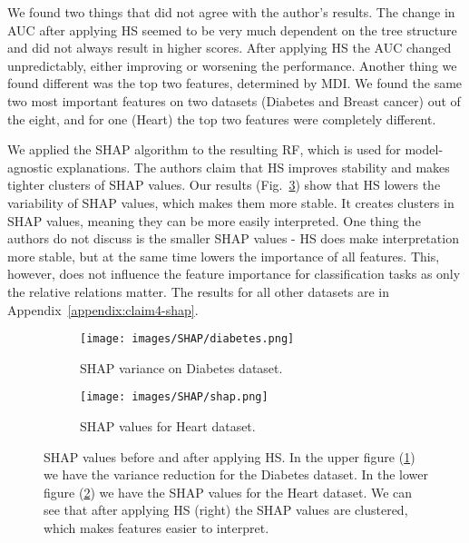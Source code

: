 We found two things that did not agree with the author's results. The change in AUC after applying HS seemed to be very much dependent on the tree structure and did not always result in higher scores. After applying HS the AUC changed unpredictably, either improving or worsening the performance. Another thing we found different was the top two features, determined by MDI. We found the same two most important features on two datasets (Diabetes and Breast cancer) out of the eight, and for one (Heart) the top two features were completely different.

We applied the SHAP algorithm \cite{lundberg2017unified} to the resulting RF, which is used for model-agnostic explanations. The authors claim that HS improves stability and makes tighter clusters of SHAP values. Our results (Fig.~\ref{fig:claim4-shap}) show that HS lowers the variability of SHAP values, which makes them more stable. It creates clusters in SHAP values, meaning they can be more easily interpreted. One thing the authors do not discuss is the smaller SHAP values - HS does make interpretation more stable, but at the same time lowers the importance of all features. This, however, does not influence the feature importance for classification tasks as only the relative relations matter. The results for all other datasets are in Appendix~\ref{appendix:claim4-shap}.

\begin{figure}[hbt]
    \centering
    \begin{subfigure}[b]{0.45\textwidth}
        \centering
        \texttt{[image: images/SHAP/diabetes.png]}
        \caption{SHAP variance on Diabetes dataset.}
        \label{fig:svar}
    \end{subfigure}
    
    \begin{subfigure}[b]{0.95\textwidth}
        \centering
        \texttt{[image: images/SHAP/shap.png]}
        \caption{SHAP values for Heart dataset.}
        \label{fig:scluster}
    \end{subfigure}
    \caption{SHAP values before and after applying HS. In the upper figure (\ref{fig:svar}) we have the variance reduction for the Diabetes dataset. In the lower figure (\ref{fig:scluster}) we have the SHAP values for the Heart dataset. We can see that after applying HS (right) the SHAP values are clustered, which makes features easier to interpret.}
    \label{fig:claim4-shap}
\end{figure}

